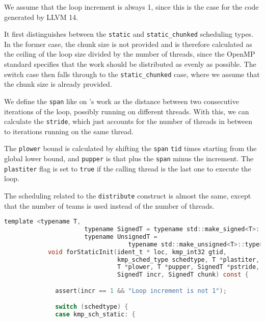 \begin{itemize}
	      We assume that the loop increment is always 1, since this is the case for the code
	      generated by LLVM 14.

	      It first distinguishes between the \texttt{static} and \texttt{static_chunked} scheduling
	      types. In the former case, the chunk size is not provided and is therefore calculated as
	      the ceiling of the loop size divided by the number of threads, since the OpenMP standard
	      specifies that the work should be distributed as evenly as possible. The switch case then
	      falls through to the \texttt{static_chunked} case, where we assume that the chunk size is
	      already provided.

	      We define the \texttt{span} like on \citeauthor{herokmp}'s work as the distance between two
	      consecutive iterations of the loop, possibly running on different threads. With this, we
	      can calculate the \texttt{stride}, which just accounts for the number of threads in
	      between to iterations running on the same thread.

	      The \texttt{plower} bound is calculated by shifting the \texttt{span} \texttt{tid} times
	      starting from the global lower bound, and \texttt{pupper} is that plus the \texttt{span}
	      minus the increment. The \texttt{plastiter} flag is set to \texttt{true} if the calling
	      thread is the last one to execute the loop.

	      The scheduling related to the \texttt{distribute} construct is almost the same, except
	      that the number of teams is used instead of the number of threads.

	      \begin{lstlisting}[language=C, caption={void Team::forStaticInit},
          label={lst:team-forstaticinit}, escapechar=@]
            template <typename T,
                      typename SignedT = typename std::make_signed<T>::type,
                      typename UnsignedT =
                                  typename std::make_unsigned<T>::type>
            void forStaticInit(ident_t * loc, kmp_int32 gtid,
                               kmp_sched_type schedtype, T *plastiter,
                               T *plower, T *pupper, SignedT *pstride,
                               SignedT incr, SignedT chunk) const {

              assert(incr == 1 && "Loop increment is not 1");

              switch (schedtype) {
              case kmp_sch_static: {


\end{lstlisting}
\end{itemize}
